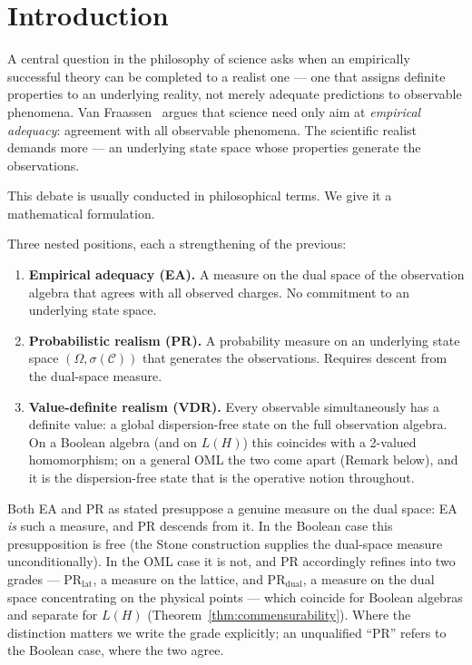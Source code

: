 \section{Introduction}
\label{sec:intro}

A central question in the philosophy of science asks when an
empirically successful theory can be completed to a realist one ---
one that assigns definite properties to an underlying reality, not
merely adequate predictions to observable phenomena.  Van
Fraassen~\cite{vanFraassen1980} argues that science need only aim at
\emph{empirical adequacy}: agreement with all observable phenomena.
The scientific realist demands more --- an underlying state space
whose properties generate the observations.

This debate is usually conducted in philosophical terms.  We give it
a mathematical formulation.

Three nested positions, each a strengthening of the previous:

\begin{enumerate}[label=(\roman*)]
  \item \textbf{Empirical adequacy (EA).}
    A measure on the dual space of the observation algebra that
    agrees with all observed charges.  No commitment to an
    underlying state space.

  \item \textbf{Probabilistic realism (PR).}
    A probability measure on an underlying state space
    $(\Omega, \sigma(\mathcal{C}))$ that generates the observations.
    Requires descent from the dual-space measure.

  \item \textbf{Value-definite realism (VDR).}
    Every observable simultaneously has a definite value: a global
    dispersion-free state on the full observation algebra.  On a
    Boolean algebra (and on $L(H)$) this coincides with a 2-valued
    homomorphism; on a general OML the two come apart (Remark below),
    and it is the dispersion-free state that is the operative notion
    throughout.
\end{enumerate}

Both EA and PR as stated presuppose a genuine measure on the dual space:
EA \emph{is} such a measure, and PR descends from it.  In the Boolean
case this presupposition is free (the Stone construction supplies the
dual-space measure unconditionally).  In the OML case it is not, and PR
accordingly refines into two grades --- $\text{PR}_{\text{lat}}$, a
measure on the lattice, and $\text{PR}_{\text{dual}}$, a measure on the
dual space concentrating on the physical points --- which coincide for
Boolean algebras and separate for $L(H)$ (Theorem~\ref{thm:commensurability}).
Where the distinction matters we write the grade explicitly; an
unqualified ``PR'' refers to the Boolean case, where the two agree.

